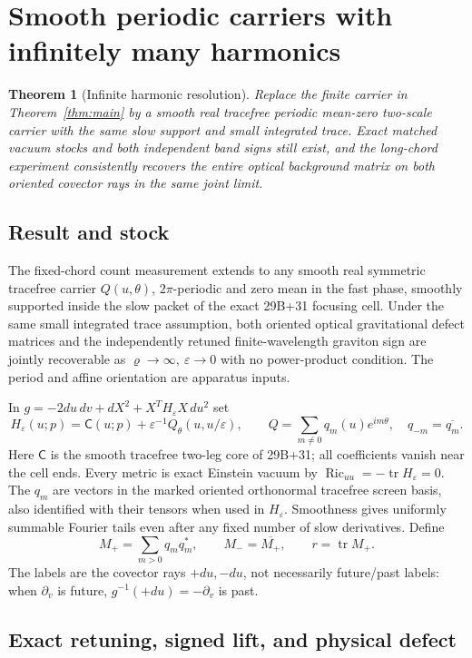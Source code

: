 \documentclass[11pt]{article}
\newtheorem{theorem}{Theorem}
\begin{document}
\section{Smooth periodic carriers with infinitely many harmonics}\label{sec:periodic}
\begin{theorem}[Infinite harmonic resolution]\label{thm:periodic}
Replace the finite carrier in Theorem~\ref{thm:main} by a smooth real
tracefree periodic mean-zero two-scale carrier with the same slow
support and small integrated trace. Exact matched vacuum stocks and
both independent band signs still exist, and the long-chord
experiment consistently recovers the entire optical background
matrix on both oriented covector rays in the same joint limit.
\end{theorem}
\subsection{Result and stock}\label{result-and-stock}

The fixed-chord count measurement extends to any smooth real symmetric tracefree carrier \(Q(u,\theta)\), \(2\pi\)-periodic and zero mean in the fast phase, smoothly supported inside the slow packet of the exact 29B+31 focusing cell. Under the same small integrated trace assumption, both oriented optical gravitational defect matrices and the independently retuned finite-wavelength graviton sign are jointly recoverable as \(\varrho\to\infty,\ \varepsilon\to0\) with no power-product condition. The period and affine orientation are apparatus inputs.

In \(g=-2du\,dv+dX^2+X^TH_\varepsilon X\,du^2\) set
\[
H_\varepsilon(u;p)=\mathsf C(u;p)+\varepsilon^{-1}Q_\theta(u,u/\varepsilon),
\qquad Q=\sum_{m\ne0}q_m(u)e^{im\theta},\quad q_{-m}=\overline{q_m}.
\]
Here \(\mathsf C\) is the smooth tracefree two-leg core of 29B+31; all coefficients vanish near the cell ends. Every metric is exact Einstein vacuum by \(\operatorname{Ric}_{uu}=-\operatorname{tr}H_\varepsilon=0\). The \(q_m\) are vectors in the marked oriented orthonormal tracefree screen basis, also identified with their tensors when used in \(H_\varepsilon\). Smoothness gives uniformly summable Fourier tails even after any fixed number of slow derivatives. Define
\[
M_+=\sum_{m>0}q_m q_m^*,\qquad M_-=\overline{M_+},\qquad r=\operatorname{tr}M_+ .
\]
The labels are the covector rays \(+du,-du\), not necessarily future/past labels: when \(\partial_v\) is future, \(g^{-1}(+du)=-\partial_v\) is past.

\subsection{Exact retuning, signed lift, and physical defect}\label{exact-retuning-signed-lift-and-physical-defect}
\end{document}
